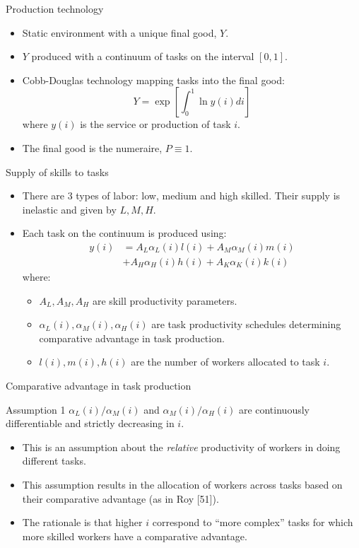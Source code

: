 \documentclass[notes=show]{beamer}
\begin{document}
\begin{frame}{Production technology}
\begin{itemize}
\item Static environment with a unique final good, $Y$. \medskip
\item $Y$ produced with a continuum of tasks on the interval $[0,1]$. \medskip
\item Cobb-Douglas technology mapping tasks into the final good:
\[
Y= \exp \left[ \int_{0}^{1} \ln y(i)di \right] \tag{11}  \label{eq11}
\]
where $y(i)$ is the service or production of task $i$. \medskip
\item The final good is the numeraire, $P \equiv 1$.
\end{itemize}
\end{frame}

\begin{frame}{Supply of skills to tasks}
\begin{itemize}
\item There are 3 types of labor: low, medium and high skilled. Their supply is inelastic and given by $L, M, H$. \medskip
\item Each task on the continuum is produced using:
\begin{align*}
y(i) & = A_{L} \alpha_{L}(i) l(i) + A_{M} \alpha_{M}(i) m(i) \\
 & + A_{H} \alpha_{H}(i) h(i) + A_{K} \alpha_{K}(i) k(i) \tag{12}  \label{eq12}
\end{align*}
where:
\begin{itemize}
\item $A_{L}, A_{M}, A_{H}$ are skill productivity parameters. \medskip
\item $ \alpha_{L}(i), \alpha_{M}(i), \alpha_{H}(i)$ are task productivity schedules determining comparative advantage in task production. \medskip
\item $ l(i), m(i), h(i)$ are the number of workers allocated to task $i$.
\end{itemize}
\end{itemize}
\end{frame}

\begin{frame}{Comparative advantage in task production}
\begin{block}{Assumption 1}
$ \alpha_{L}(i)/\alpha_{M}(i)$ and $ \alpha_{M}(i)/\alpha_{H}(i)$ are continuously differentiable and strictly decreasing in $i$.
\end{block}
\begin{itemize}
\item This is an assumption about the \textit{relative} productivity of workers in doing different tasks. \medskip
\item This assumption results in the allocation of workers across tasks based on their comparative advantage (as in Roy [51]).\medskip
\item The rationale is that higher $i$ correspond to ``more complex'' tasks for which more skilled workers have a comparative advantage.
\end{itemize}
\end{frame}
\end{document}
